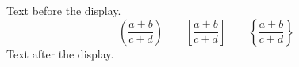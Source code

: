 \documentclass{article}
\begin{document}
Text before the display.
\[
  \left( \frac{a + b}{c + d} \right)
  \qquad
  \left[ \frac{a + b}{c + d} \right]
  \qquad
  \left\{ \frac{a + b}{c + d} \right\}
\]
Text after the display.
\end{document}
